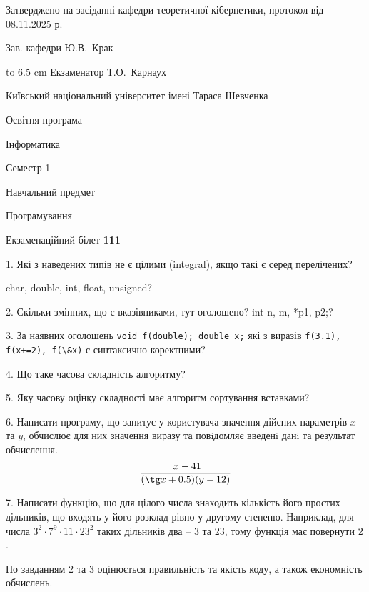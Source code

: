 \documentclass[12pt, ukrainian]{article}
\def\code#1{\Verb!#1!}
\begin{document}
{\smallskip\smallskip \begin {scriptsize} Затверджено на засіданні кафедри теоретичної кібернетики, протокол   від   08.11.2025 р.\par\smallskip\smallskip\smallskip\smallskip
{\parbox {6.5 cm} {Зав. кафедри \dotfill Ю.В.~Крак}}\hspace {0.7cm} {\hbox to 6.5 cm { Екзаменатор \dotfill Т.О.~Карнаух}} \end{scriptsize}}
\newpage
{{\begin {scriptsize}\par
{ \center  Київський національний університет імені Тараса Шевченка \par}
{\parbox {5 cm}{Освітня програма \hfill}{\parbox {7 cm}{Інформатика\hfill}}\parbox {6 cm}{\hfill Семестр 1}}\par
{\parbox {5 cm} {Навчальний предмет \hfill}\parbox {7 cm}{Програмування \hfill}\parbox {6cm}{\hfill}\par}\vspace{-15pt} \end{scriptsize}}{\center Екзаменаційний білет \No \textbf { 111 }\par}}
{%
1. Які з наведених типів не є цілими (integral), якщо такі є серед перелічених?

char, double, int, float, unsigned?
\par
\vspace{2mm}
2. Скільки змінних, що є вказівниками, тут оголошено?
int n, m, *p1, p2;?
\par
\vspace{2mm}
3. За наявних оголошень \code{void f(double); double x;} які з виразів \code{f(3.1), f(x+=2), f(\&x)} є синтаксично коректними?
\par
\vspace{2mm}
4. Що таке часова складність алгоритму?
\par
\vspace{2mm}
5. Яку часову оцінку складності має алгоритм сортування вставками?
\par
\vspace{2mm}
6. Написати програму, що запитує у користувача значення дійсних параметрів $x$ та $y$, обчислює для них значення виразу та повiдомляє введенi данi та результат обчислення.
$$\frac{\ x - 41}{(\tg x + 0.5) (y - 12)}$$ 

\par
7. Написати функцію, що для цілого числа знаходить кількість його простих дільників, що входять у його розклад рівно у другому степеню. Наприклад, для числа $3^2{\cdot}7^9{\cdot}11{\cdot}23^{2}$ таких дільників два – $3$ та $23$, тому функція має повернути $2$.

По завданням 2 та 3 оцінюється правильність та якість коду, а також економність обчислень.

}
\end{document}
